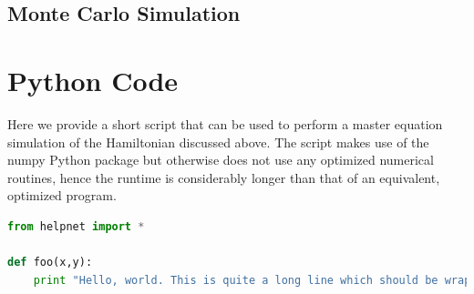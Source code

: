 \subsection{Monte Carlo Simulation}



\section{Python Code}

Here we provide a short script that can be used to perform a master equation simulation of the Hamiltonian discussed above. The script makes use of the numpy Python package but otherwise does not use any optimized numerical routines, hence the runtime is considerably longer than that of an equivalent, optimized program.

\begin{lstlisting}[language=python]
from helpnet import *

def foo(x,y):
	print "Hello, world. This is quite a long line which should be wrapped I guess. The sum x + y = %g" % (x,y)
\end{lstlisting}
